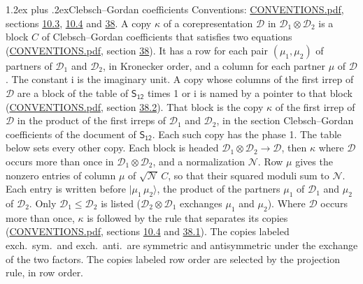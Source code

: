 \documentclass[10pt,a4paper]{article}
\makeatletter
\renewcommand\section{\@startsection{section}{1}{\z@}{-3ex plus -1ex minus -.2ex}%
  {1.2ex plus .2ex}{\normalfont\large\sffamily\bfseries\color{parttitle}}}
\numberwithin{equation}{section}
\newcommand{\grp}[1]{\mathsf{#1}}
\newcommand{\iunit}{\mathrm{i}}
\newcommand{\irrprod}{\otimes}
\newcommand{\mult}{\kappa}
\newcommand{\intx}{\mu}
\newcommand{\cgnorm}{\mathcal{N}}
\newcommand{\prodket}[2]{\lvert {#1}\,{#2}\rangle}
\makeatother
\begin{document}
\section{Clebsch--Gordan coefficients}\label{s:clebsch_gordan}
Conventions: \href{../../CONVENTIONS.pdf}{CONVENTIONS.pdf}, sections \href{../../../rotation/CONVENTIONS.pdf\#conv.10.3}{10.3}, \href{../../../rotation/CONVENTIONS.pdf\#conv.10.4}{10.4} and \href{../../CONVENTIONS.pdf\#conv.38}{38}.
\leavevmode\label{n:index.copy}\label{n:matrix.cg.stored}A copy $\mult$ of a corepresentation $\mathcal{D}$ in $\mathcal{D}_1\irrprod\mathcal{D}_2$ is a block $C$ of Clebsch--Gordan coefficients that satisfies two equations (\href{../../CONVENTIONS.pdf}{CONVENTIONS.pdf}, section \href{../../CONVENTIONS.pdf\#conv.38}{38}). \label{n:index.cg}It has a row for each pair $(\intx_1, \intx_2)$ of partners of $\mathcal{D}_1$ and $\mathcal{D}_2$, in Kronecker order, and a column for each partner $\intx$ of $\mathcal{D}$.
The constant $\iunit$ is the imaginary unit.
A copy whose columns of the first irrep of $\mathcal{D}$ are a block of the table of $\grp{S_{12}}$ times 1 or $\iunit$ is named by a pointer to that block (\href{../../CONVENTIONS.pdf}{CONVENTIONS.pdf}, section \href{../../CONVENTIONS.pdf\#conv.38.2}{38.2}). That block is the copy $\mult$ of the first irrep of $\mathcal{D}$ in the product of the first irreps of $\mathcal{D}_1$ and $\mathcal{D}_2$, in the section Clebsch--Gordan coefficients of the document of \href{../../../rotation/data/pdf/S12.pdf}{$\grp{S_{12}}$}. Each such copy has the phase 1. The table below sets every other copy.
Each block is headed $\mathcal{D}_1\irrprod\mathcal{D}_2\to\mathcal{D}$, then $\mult$ where $\mathcal{D}$ occurs more than once in $\mathcal{D}_1\irrprod\mathcal{D}_2$, and a normalization $\cgnorm$. Row $\intx$ gives the nonzero entries of column $\intx$ of $\sqrt{\cgnorm}\,C$, so that their squared moduli sum to $\cgnorm$. \label{n:vector.ket.product}Each entry is written before $\prodket{\intx_1}{\intx_2}$, the product of the partners $\intx_1$ of $\mathcal{D}_1$ and $\intx_2$ of $\mathcal{D}_2$. Only $\mathcal{D}_1 \le \mathcal{D}_2$ is listed ($\mathcal{D}_2\irrprod\mathcal{D}_1$ exchanges $\intx_1$ and $\intx_2$).
Where $\mathcal{D}$ occurs more than once, $\mult$ is followed by the rule that separates its copies (\href{../../CONVENTIONS.pdf}{CONVENTIONS.pdf}, sections \href{../../../rotation/CONVENTIONS.pdf\#conv.10.4}{10.4} and \href{../../CONVENTIONS.pdf\#conv.38.1}{38.1}). \label{n:abbreviation.exchange}The copies labeled exch.\ sym.\ and exch.\ anti.\ are symmetric and antisymmetric under the exchange of the two factors. The copies labeled row order are selected by the projection rule, in row order.
\end{document}
